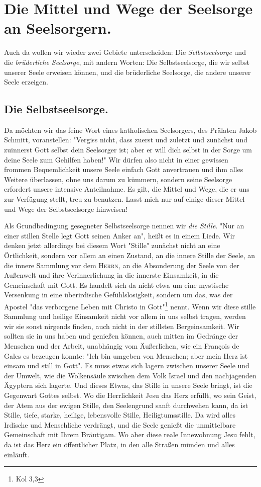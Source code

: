 \documentclass[a5paper,openany]{book}
\begin{document}
\chapter{Die Mittel und Wege der Seelsorge an Seelsorgern.}
Auch da wollen wir wieder zwei Gebiete unterscheiden: Die \emph{Selbstseelsorge} und die \emph{brüderliche Seelsorge}, mit andern Worten: Die Selbstseelsorge, die wir selbst unserer Seele erweisen können, und die brüderliche Seelsorge, die andere unserer Seele erzeigen.
\renewcommand\thesection{\Alph{section}.}
\section{Die Selbstseelsorge.}
Da möchten wir das feine Wort eines katholischen Seelsorgers, des Prälaten Jakob Schmitt, voranstellen: "Vergiss nicht, dass zuerst und zuletzt und zunächst und zuinnerst Gott selbst dein Seelsorger ist; aber er will dich selbst in der Sorge um deine Seele zum Gehilfen haben!" Wir dürfen also nicht in einer gewissen frommen Bequemlichkeit unsere Seele einfach Gott anvertrauen und ihm alles Weitere überlassen, ohne uns darum zu kümmern, sondern seine Seelsorge erfordert unsere intensive Anteilnahme. Es gilt, die Mittel und Wege, die er uns zur Verfügung stellt, treu zu benutzen. Lasst mich nur auf einige dieser Mittel und Wege der Selbstseelsorge hinweisen!
\par
Als Grundbedingung gesegneter Selbstseelsorge nennen wir \emph{die Stille}. "Nur an einer stillen Stelle legt Gott seinen Anker an", heißt es in einem Liede. Wir denken jetzt allerdings bei diesem Wort "Stille" zunächst nicht an eine Örtlichkeit, sondern vor allem an einen Zustand, an die innere Stille der Seele, an die innere Sammlung vor dem \textsc{Herrn}, an die Absonderung der Seele von der Außenwelt und ihre Verinnerlichung in die innerste Einsamkeit, in die Gemeinschaft mit Gott. Es handelt sich da nicht etwa um eine mystische Versenkung in eine überirdische Gefühlslosigkeit, sondern um das, was der Apostel "das  verborgene Leben mit Christo in Gott"\footnote{Kol 3,3} nennt. Wenn wir diese stille Sammlung und heilige Einsamkeit nicht vor allem in uns selbst tragen, werden wir sie sonst nirgends finden, auch nicht in der stillsten Bergeinsamkeit. Wir sollten sie in uns haben und genießen können, auch mitten im Gedränge der Menschen und der Arbeit, unabhängig vom Äußerlichen, wie ein François de Gales es bezeugen konnte: "Ich bin umgeben von Menschen; aber mein Herz ist einsam und still in Gott". Es muss etwas sich lagern zwischen unserer Seele und der Umwelt, wie die Wolkensäule zwischen dem Volk Israel und den nachjagenden Ägyptern sich lagerte. Und dieses Etwas, das Stille in unsere Seele bringt, ist die Gegenwart Gottes selbst. Wo die Herrlichkeit Jesu das Herz erfüllt, wo sein Geist, der Atem aus der ewigen Stille, den Seelengrund sanft durchwehen kann, da ist Stille, tiefe, starke, heilige, lebensvolle Stille, Heiligtumsstille. Da wird alles Irdische und Menschliche verdrängt, und die Seele genießt die unmittelbare Gemeinschaft mit Ihrem Bräutigam. Wo aber diese reale Innewohnung Jesu fehlt, da ist das Herz ein öffentlicher Platz, in den alle Straßen münden und alles einläuft.
\end{document}
